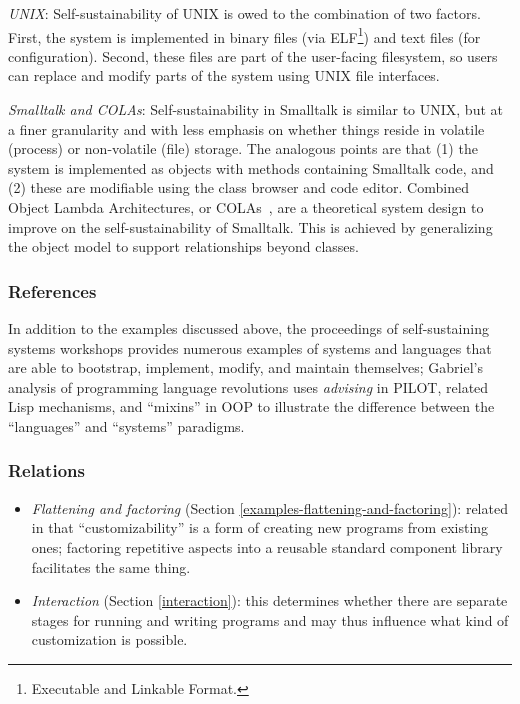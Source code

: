 \emph{UNIX}: Self-sustainability of UNIX is owed to the combination of
two factors. First, the system is implemented in binary files (via
ELF\footnote{Executable and Linkable Format.}) and text files (for
configuration). Second, these files are part of the user-facing
filesystem, so users can replace and modify parts of the system using
UNIX file interfaces.

\emph{Smalltalk and COLAs}: Self-sustainability in Smalltalk is similar
to UNIX, but at a finer granularity and with less emphasis on whether
things reside in volatile (process) or non-volatile (file) storage. The
analogous points are that (1) the system is implemented as objects with
methods containing Smalltalk code, and (2) these are modifiable using
the class browser and code editor. Combined Object Lambda Architectures,
or COLAs~\cite{COLAs}, are a theoretical system design to improve on the
self-sustainability of Smalltalk. This is achieved by generalizing the
object model to support relationships beyond classes.

\hypertarget{references}{%
\subsubsection{References}\label{references}}

In addition to the examples discussed above, the proceedings of
self-sustaining systems workshops
\cite{SelfSustaining2008,SelfSustaining2010} provides numerous examples
of systems and languages that are able to bootstrap, implement, modify,
and maintain themselves; Gabriel's analysis of programming language
revolutions \cite{PLrev} uses \emph{advising} in PILOT, related Lisp
mechanisms, and ``mixins'' in OOP to illustrate the difference between
the ``languages'' and ``systems'' paradigms.

\hypertarget{relations}{%
\subsubsection{Relations}\label{relations}}

\begin{itemize}
\tightlist
\item
  \emph{Flattening and factoring} (Section
  \ref{examples-flattening-and-factoring}): related in that
  ``customizability'' is a form of creating new programs from existing
  ones; factoring repetitive aspects into a reusable standard component
  library facilitates the same thing.
\item
  \emph{Interaction} (Section \ref{interaction}): this determines
  whether there are separate stages for running and writing programs and
  may thus influence what kind of customization is possible.
\end{itemize}

